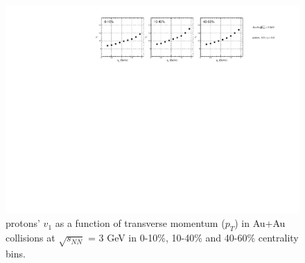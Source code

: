 \begin{figure}[h]
\includegraphics[scale=0.7]{chapter3/fig/v1ptpikp/protonp_v1pt_wide_cent.pdf}
\caption{protons' $v_{1}$ as a function of transverse momentum ($p_{T}$) in Au+Au collisions at $\sqrt{s_{NN}}$ = 3 GeV in 0-10\%, 10-40\% and 40-60\% centrality bins.}
\label{proton_v1pt_widecent}
\end{figure}

